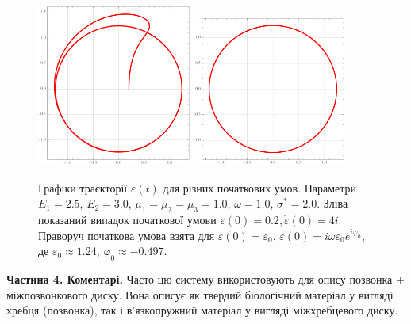 \documentclass{hw_template}
\begin{document}
\begin{figure}[H]
    \centering
    \includegraphics[width=0.45\textwidth]{images/exam/circle_wrong.pdf}
    \includegraphics[width=0.45\textwidth]{images/exam/circle_correct.pdf}
    \caption{Графіки траєкторії $\varepsilon(t)$ для різних початкових умов.
    Параметри $E_1=2.5$, $E_2=3.0$, $\mu_1=\mu_2=\mu_3=1.0$, $\omega=1.0$,
    $\sigma^*=2.0$. Зліва показаний випадок початкової умови $\varepsilon(0)=0.2,
    \dot{\varepsilon}(0)=4i$. Праворуч початкова умова взята для $\varepsilon(0)=\varepsilon_0$, $\varepsilon(0)=i\omega \varepsilon_0 e^{i\varphi_0}$, де $\varepsilon_0 \approx 1.24$, $\varphi_0 \approx -0.497$.}
    \label{fig:complex}
\end{figure}


\textcolor{blue!90!white}{\textbf{Частина 4. Коментарі.}} Часто цю систему використовують 
для опису позвонка + міжпозвонкового диску. Вона описує як твердий біологічний матеріал
у вигляді хребця (позвонка), так і в'язкопружний матеріал у вигляді міжхребцевого диску.
\end{document}
